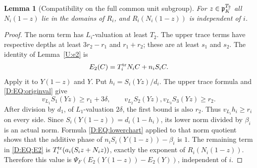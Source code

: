 \documentclass[11pt]{amsart}
\newtheorem{lemma}[theorem]{Lemma}
\theoremstyle{definition}
\theoremstyle{remark}
\begin{document}
\begin{lemma}[Compatibility on the full common unit subgroup]\label{D:EQ:Rcompat}
For $z\in\mathfrak p_K^{T_2}$ all $N_i(1-z)$ lie in the domains of $R_i$, and
$R_i(N_i(1-z))$ is independent of $i$.
\end{lemma}
\begin{proof}
The norm term has $L_i$-valuation at least $T_2$.
The upper trace terms have respective depths at least
$3r_2-r_1$ and $r_1+r_2$; these are at least $s_1$ and $s_2$.
The identity of Lemma~\ref{U:e2} is
\begin{equation}\label{D:EQ:E2}
 E_2(C)=T_i^{\rm tr}N_iC+n_iS_iC.
\end{equation}
Apply it to $Y(1-z)$ and $Y$. Put $h_i=S_i(Yz)/d_i$.
The upper trace formula and \eqref{D:EQ:originval} give
\[
 v_{L_1}S_1(Yz)\ge r_1+3\delta,\qquad
 v_{L_2}S_2(Yz),v_{L_3}S_3(Yz)\ge r_2.
\]
After division by $d_1$, of $L_1$-valuation $2\delta$, the first
bound is also $r_2$. Thus $v_{L_i}h_i\ge r_i$ on every side.
Since $S_i(Y(1-z))=d_i(1-h_i)$, its lower norm divided by $\beta_i$
is an actual norm. Formula \eqref{D:EQ:lowerchart} applied to that norm
quotient shows that the additive phase of
$n_iS_i(Y(1-z))-\beta_i$ is $1$.
The remaining term in \eqref{D:EQ:E2} is
$T_i^{\rm tr}(a_i(S_iz+N_iz))$, exactly the exponent of
$R_i(N_i(1-z))$. Therefore this value is
$\Psi_F(E_2(Y(1-z))-E_2(Y))$, independent of $i$.
\end{proof}
\end{document}
